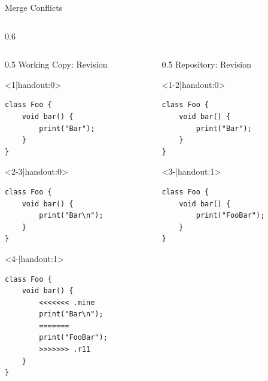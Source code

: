 \begin{frame}[fragile]{Merge Conflicts}	%
	\begin{columns}[T, onlytextwidth]
		\begin{column}{0.6\linewidth}
			\begin{columns}[T]
				\begin{column}{0.5\linewidth}
					Working Copy: Revision \only<4>{\emph{11$^*$}}\\[2mm]

					\begin{onlyenv}<1|handout:0>
						\begin{lstlisting}[style=java,basicstyle=\fontfamily{pcr}\small\selectfont,numbers=none,escapechar=|]
class Foo {
	void bar() {
		print("Bar");
	}
}	
						\end{lstlisting}
					\end{onlyenv}
					\begin{onlyenv}
						\begin{lstlisting}[style=java,basicstyle=\fontfamily{pcr}\small\selectfont,numbers=none,escapechar=|]
class Foo {
	void bar() {
		print("Bar\n");
	}
}
						\end{lstlisting}
					\end{onlyenv}
					\begin{onlyenv}
						\begin{lstlisting}[style=java,basicstyle=\fontfamily{pcr}\small\selectfont,numbers=none,escapechar=|]
class Foo {
	void bar() {		
		<<<<<<< .mine
		print("Bar\n");
		=======
		print("FooBar");
		>>>>>>> .r11
	}
}	
						\end{lstlisting}
					\end{onlyenv}
				\end{column}
				\begin{column}{0.5\linewidth}
					Repository: Revision \only<3->{\emph{11}}

					\begin{onlyenv}
						\begin{lstlisting}[style=java,basicstyle=\fontfamily{pcr}\small\selectfont,numbers=none,escapechar=|]
class Foo {
	void bar() {
		print("Bar");
	}
}
						\end{lstlisting}
					\end{onlyenv}
					\begin{onlyenv}
						\begin{lstlisting}[style=java,basicstyle=\fontfamily{pcr}\small\selectfont,numbers=none,escapechar=|]
class Foo {
	void bar() {
		print("FooBar");
	}
}
						\end{lstlisting}
					\end{onlyenv}
				\end{column}
			\end{columns}


\end{column}
\end{columns}
\end{frame}
